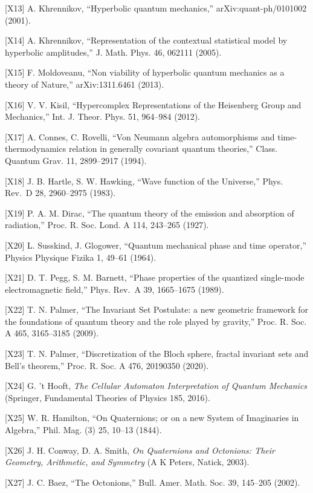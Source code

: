 \documentclass[
  a4paper,
]{article}
\begin{document}
{[}X13{]} A. Khrennikov, ``Hyperbolic quantum mechanics,''
arXiv:quant-ph/0101002 (2001).

{[}X14{]} A. Khrennikov, ``Representation of the contextual statistical
model by hyperbolic amplitudes,'' J. Math. Phys. 46, 062111 (2005).

{[}X15{]} F. Moldoveanu, ``Non viability of hyperbolic quantum mechanics
as a theory of Nature,'' arXiv:1311.6461 (2013).

{[}X16{]} V. V. Kisil, ``Hypercomplex Representations of the Heisenberg
Group and Mechanics,'' Int. J. Theor. Phys. 51, 964--984 (2012).

{[}X17{]} A. Connes, C. Rovelli, ``Von Neumann algebra automorphisms and
time-thermodynamics relation in generally covariant quantum theories,''
Class. Quantum Grav. 11, 2899--2917 (1994).

{[}X18{]} J. B. Hartle, S. W. Hawking, ``Wave function of the
Universe,'' Phys. Rev.~D 28, 2960--2975 (1983).

{[}X19{]} P. A. M. Dirac, ``The quantum theory of the emission and
absorption of radiation,'' Proc. R. Soc. Lond. A 114, 243--265 (1927).

{[}X20{]} L. Susskind, J. Glogower, ``Quantum mechanical phase and time
operator,'' Physics Physique Fizika 1, 49--61 (1964).

{[}X21{]} D. T. Pegg, S. M. Barnett, ``Phase properties of the quantized
single-mode electromagnetic field,'' Phys. Rev.~A 39, 1665--1675 (1989).

{[}X22{]} T. N. Palmer, ``The Invariant Set Postulate: a new geometric
framework for the foundations of quantum theory and the role played by
gravity,'' Proc. R. Soc. A 465, 3165--3185 (2009).

{[}X23{]} T. N. Palmer, ``Discretization of the Bloch sphere, fractal
invariant sets and Bell's theorem,'' Proc. R. Soc. A 476, 20190350
(2020).

{[}X24{]} G. 't Hooft, \emph{The Cellular Automaton Interpretation of
Quantum Mechanics} (Springer, Fundamental Theories of Physics 185,
2016).

{[}X25{]} W. R. Hamilton, ``On Quaternions; or on a new System of
Imaginaries in Algebra,'' Phil. Mag. (3) 25, 10--13 (1844).

{[}X26{]} J. H. Conway, D. A. Smith, \emph{On Quaternions and Octonions:
Their Geometry, Arithmetic, and Symmetry} (A K Peters, Natick, 2003).

{[}X27{]} J. C. Baez, ``The Octonions,'' Bull. Amer. Math. Soc. 39,
145--205 (2002).
\end{document}
